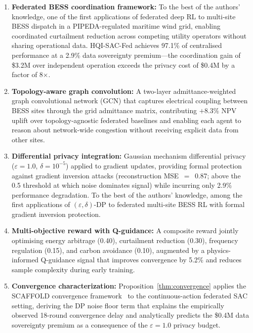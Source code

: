 \documentclass[journal]{IEEEtran}
\begin{document}
\begin{enumerate}
\item \textbf{Federated BESS coordination framework:} To the best of
  the authors' knowledge, one of the first applications of federated
  deep RL to multi-site BESS dispatch in a PIPEDA-regulated maritime
  wind grid, enabling coordinated curtailment reduction across competing
  utility operators without sharing operational data.
  HQI-SAC-Fed achieves 97.1\% of centralised performance at a
  2.9\% data sovereignty premium---the coordination gain of \$3.2M
  over independent operation exceeds the privacy cost of \$0.4M by
  a factor of 8$\times$.

\item \textbf{Topology-aware graph convolution:} A two-layer
  admittance-weighted graph convolutional network (GCN) that captures
  electrical coupling between BESS sites through the grid admittance
  matrix, contributing $+8.3\%$ NPV uplift over topology-agnostic
  federated baselines and enabling each agent to reason about network-wide
  congestion without receiving explicit data from other sites.

\item \textbf{Differential privacy integration:} Gaussian mechanism
  differential privacy ($\varepsilon = 1.0$, $\delta = 10^{-5}$)
  applied to gradient updates, providing formal protection against
  gradient inversion attacks (reconstruction MSE~$=$~0.87; above the
  0.5 threshold at which noise dominates signal) while incurring only
  2.9\% performance degradation. To the best of the authors'
  knowledge, among the first applications of $(\varepsilon,\delta)$-DP
  to federated multi-site BESS RL with formal gradient inversion
  protection.

\item \textbf{Multi-objective reward with Q-guidance:} A composite
  reward jointly optimising energy arbitrage (0.40), curtailment
  reduction (0.30), frequency regulation (0.15), and carbon avoidance
  (0.10), augmented by a physics-informed Q-guidance signal that
  improves convergence by 5.2\% and reduces sample complexity
  during early training.

\item \textbf{Convergence characterization:}
  Proposition~\ref{thm:convergence} applies the SCAFFOLD convergence
  framework~\cite{karimireddy2020scaffold} to the continuous-action
  federated SAC setting, deriving the DP noise floor term that explains
  the empirically observed 18-round convergence delay and analytically
  predicts the \$0.4M data sovereignty premium as a consequence of the
  $\varepsilon{=}1.0$ privacy budget.
\end{enumerate}
\end{document}
